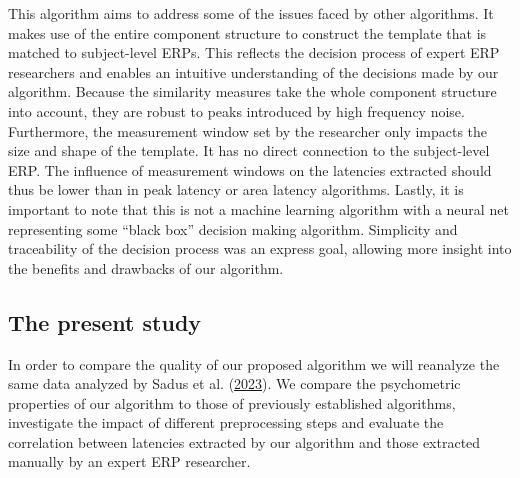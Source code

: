 \documentclass[
  man]{apa7}
\begin{document}
This algorithm aims to address some of the issues faced by other algorithms. It makes use of the entire component structure to construct the template that is matched to subject-level ERPs. This reflects the decision process of expert ERP researchers and enables an intuitive understanding of the decisions made by our algorithm. Because the similarity measures take the whole component structure into account, they are robust to peaks introduced by high frequency noise. Furthermore, the measurement window set by the researcher only impacts the size and shape of the template. It has no direct connection to the subject-level ERP. The influence of measurement windows on the latencies extracted should thus be lower than in peak latency or area latency algorithms. Lastly, it is important to note that this is not a machine learning algorithm with a neural net representing some ``black box'' decision making algorithm. Simplicity and traceability of the decision process was an express goal, allowing more insight into the benefits and drawbacks of our algorithm.

\hypertarget{the-present-study}{%
\subsection{The present study}\label{the-present-study}}

In order to compare the quality of our proposed algorithm we will reanalyze the same data analyzed by Sadus et al. (\protect\hyperlink{ref-sadus2023multiverse}{2023}). We compare the psychometric properties of our algorithm to those of previously established algorithms, investigate the impact of different preprocessing steps and evaluate the correlation between latencies extracted by our algorithm and those extracted manually by an expert ERP researcher.
\end{document}
